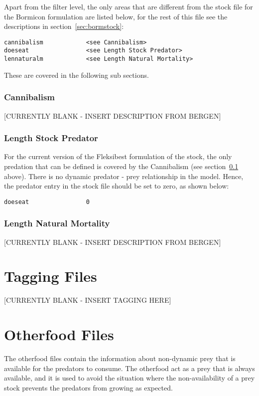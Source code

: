 \documentclass [a4paper, 10pt]{book}
\begin{document}
\bigskip
Apart from the filter level, the only areas that are different from the stock file for the Bormicon formulation are listed below, for the rest of this file see the descriptions in section~\ref{sec:bormstock}:

\begin{verbatim}
cannibalism            <see Cannibalism>
doeseat                <see Length Stock Predator>
lennaturalm            <see Length Natural Mortality>
\end{verbatim}

These are covered in the following sub sections.

\subsection{Cannibalism}\label{subsec:stockcannibalism}
[CURRENTLY BLANK - INSERT DESCRIPTION FROM BERGEN]

\subsection{Length Stock Predator}
For the current version of the Fleksibest formulation of the stock, the only predation that can be defined is covered by the Cannibalism (see section~\ref{subsec:stockcannibalism} above).  There is no dynamic predator - prey relationship in the model.  Hence, the predator entry in the stock file should be set to zero, as shown below:

\begin{verbatim}
doeseat                0
\end{verbatim}

\subsection{Length Natural Mortality}\label{subsec:lennatmort}
[CURRENTLY BLANK - INSERT DESCRIPTION FROM BERGEN]

\chapter{Tagging Files}\label{chap:tag}
[CURRENTLY BLANK - INSERT TAGGING HERE]

\chapter{Otherfood Files}\label{chap:other}
The otherfood files contain the information about non-dynamic prey that is available for the predators to consume.  The otherfood act as a prey that is always available, and it is used to avoid the situation where the non-availability of a prey stock prevents the predators from growing as expected.
\end{document}
